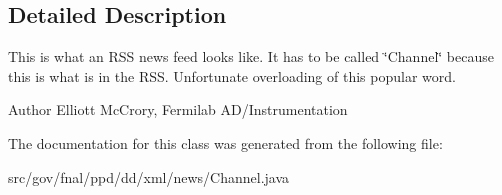 \subsection{Detailed Description}
This is what an R\-S\-S news feed looks like. It has to be called \char`\"{}\-Channel\char`\"{} because this is what is in the R\-S\-S. Unfortunate overloading of this popular word.

\begin{DoxyAuthor}{Author}
Elliott Mc\-Crory, Fermilab A\-D/\-Instrumentation 
\end{DoxyAuthor}


The documentation for this class was generated from the following file\-:\begin{DoxyCompactItemize}
\item 
src/gov/fnal/ppd/dd/xml/news/Channel.\-java\end{DoxyCompactItemize}
